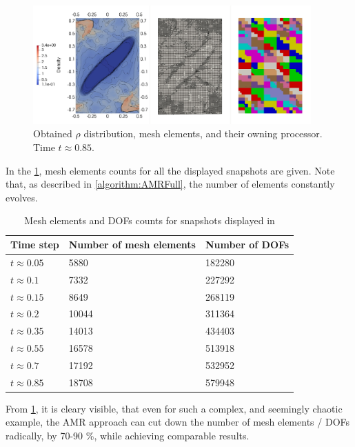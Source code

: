 \begin{figure}[H]
	\begin{center}
		\includegraphics[width=0.95\textwidth]{img/mhd-blast/new/adapt-full16.jpg}
\vspace{-3mm}
	\caption{Obtained $\rho$ distribution, mesh elements, and their owning processor. Time $t\approx 0.85$.}
	\label{figure:amrBlast8}
	\end{center}
\end{figure}
\vspace{-6mm}
In the \cref{table:meshElems}, mesh elements counts for all the displayed snapshots are given. Note that, as described in \cref{algorithm:AMRFull}, the number of elements constantly evolves.

\begin{table}[H]
    \begin{tabular}
		{ | l | l | p{5cm} |}
		\hline
    \textbf{Time step} & \textbf{Number of mesh elements} & \textbf{Number of DOFs} \\
		\hline
    $t\approx 0.05$ & 5880 & 182280  \\ \hline
    $t\approx 0.1$ & 7332 & 227292  \\ \hline
    $t\approx 0.15$ & 8649 & 268119  \\ \hline
    $t\approx 0.2$ & 10044 & 311364  \\ \hline
    $t\approx 0.35$ & 14013 & 434403  \\ \hline
    $t\approx 0.55$ & 16578  & 513918 \\ \hline
    $t\approx 0.7$ & 17192 & 532952  \\ \hline
    $t\approx 0.85$ & 18708 & 579948  \\ \hline
    \end{tabular}
	\caption{Mesh elements and DOFs counts for snapshots displayed in }
\label{table:meshElems}
\end{table}

From \cref{table:meshElems}, it is cleary visible, that even for such a complex, and seemingly chaotic example, the AMR approach can cut down the number of mesh elements / DOFs radically, by 70-90 \%, while achieving comparable results. 

